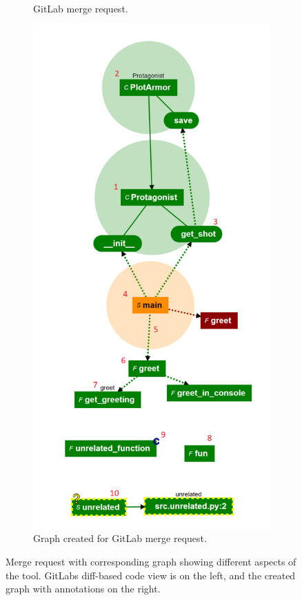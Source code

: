 \documentclass[a4paper,11pt,twoside]{article}
\theoremstyle{definition} %
\begin{document}
\begin{figure}
\begin{subfigure}{.5\textwidth}
  \caption{GitLab merge request.}
  \label{fig:GitLabExample}
\end{subfigure}%
\begin{subfigure}{.5\textwidth}
  \centering
  \includegraphics[width=1.0\linewidth]{Subfigures/annotated_example_graph.png}
  \caption{Graph created for GitLab merge request.}
  \label{fig:ReviewVisExample}
\end{subfigure}
\caption{Merge request with corresponding graph showing different aspects of the tool. GitLabs diff-based code view is on the left, and the created graph with annotations on the right.}
\label{fig:CodeReviewExample}
\end{figure}
\end{document}

